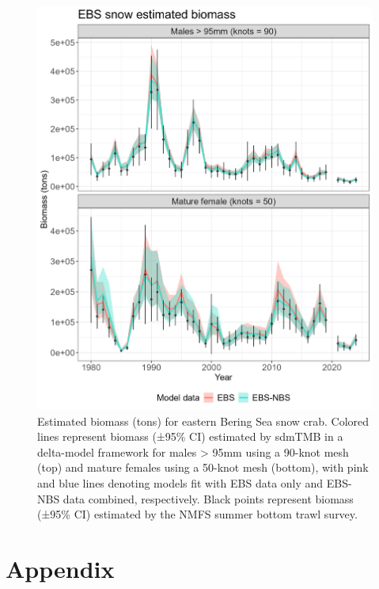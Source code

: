 \documentclass[
]{article}
\begin{document}
\begin{figure}

{\centering \includegraphics[width=1\linewidth,height=1\textheight]{../SNOW/Figures/snowEBSNBS.biomass.index} 

}

\caption{Estimated biomass (tons) for eastern Bering Sea snow crab. Colored lines represent biomass (±95\% CI) estimated by sdmTMB in a delta-model framework for males > 95mm using a 90-knot mesh (top) and mature females using a 50-knot mesh (bottom), with pink and blue lines denoting models fit with EBS data only and EBS-NBS data combined, respectively. Black points represent biomass (±95\% CI) estimated by the NMFS summer bottom trawl survey.}\label{fig:snow-bio-index-EBSNBS}
\end{figure}

\clearpage

\section*{Appendix}\label{appendix}
\end{document}
